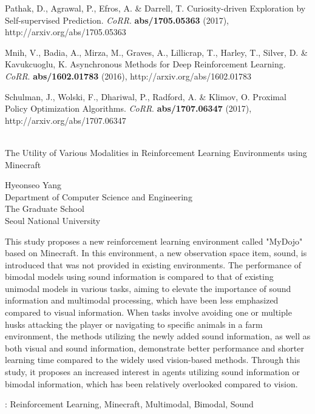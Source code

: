 \documentclass[oneside, under, ko]{snuthesis}
\begin{document}
\begin{thebibliography}{00}
    Pathak, D., Agrawal, P., Efros, A. \& Darrell, T. Curiosity-driven Exploration by Self-supervised Prediction. {\em CoRR}. \textbf{abs/1705.05363} (2017), http://arxiv.org/abs/1705.05363


    Mnih, V., Badia, A., Mirza, M., Graves, A., Lillicrap, T., Harley, T., Silver, D. \& Kavukcuoglu, K. Asynchronous Methods for Deep Reinforcement Learning. {\em CoRR}. \textbf{abs/1602.01783} (2016), http://arxiv.org/abs/1602.01783

    Schulman, J., Wolski, F., Dhariwal, P., Radford, A. \& Klimov, O. Proximal Policy Optimization Algorithms. {\em CoRR}. \textbf{abs/1707.06347} (2017), http://arxiv.org/abs/1707.06347


\end{thebibliography}



% 



\newpage
{}
\begin{center}
    \fontsize{16}{32}\selectfont
    \abstractnamealt\\
    \fontsize{22}{36}\selectfont
    The Utility of Various Modalities in Reinforcement Learning Environments using Minecraft 
    \vspace{1cm}
    \fontsize{14}{14}\selectfont
    \begin{flushright}
        Hyeonseo Yang\\
        Department of Computer Science and Engineering\\
        The Graduate School \\ 
        Seoul National University \\ 
    \end{flushright}
		
\end{center}

\begin{center}
    \fontsize{11}{11}\selectfont
    This study proposes a new reinforcement learning environment called "MyDojo" based on Minecraft. In this environment, a new observation space item, sound, is introduced that was not provided in existing environments. The performance of bimodal models using sound information is compared to that of existing unimodal models in various tasks, aiming to elevate the importance of sound information and multimodal processing, which have been less emphasized compared to visual information. When tasks involve avoiding one or multiple husks attacking the player or navigating to specific animals in a farm environment, the methods utilizing the newly added sound information, as well as both visual and sound information, demonstrate better performance and shorter learning time compared to the widely used vision-based methods. Through this study, it proposes an increased interest in agents utilizing sound information or bimodal information, which has been relatively overlooked compared to vision.
\end{center}

\vfill\vspace*{\fill}
	\noindent
	{\bfseries \keywordnamealt}: Reinforcement Learning, Minecraft, Multimodal, Bimodal, Sound 
\end{document}
